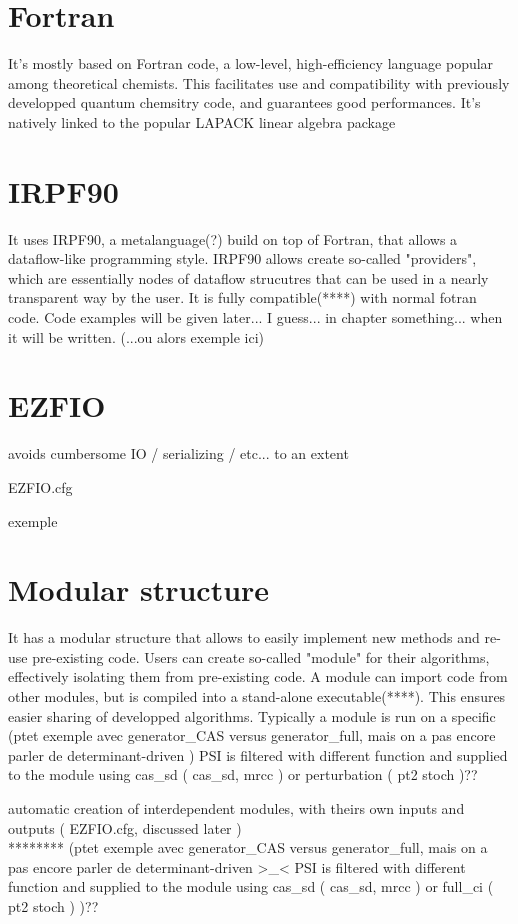 \documentclass[./thesis.tex]{subfiles}
\begin{document}
\section{Fortran}
It's mostly based on Fortran code, a low-level, high-efficiency language popular among theoretical chemists. This facilitates use and compatibility with previously developped quantum chemsitry code, and guarantees good performances. It's natively linked to the popular LAPACK linear algebra package

\section{IRPF90}
It uses IRPF90, a metalanguage(?) build on top of Fortran, that allows a dataflow-like programming style.
IRPF90 allows create so-called "providers", which are essentially nodes of dataflow strucutres that can be used in a nearly transparent way by the user. It is fully compatible(****) with normal fotran code. Code examples will be given later... I guess... in chapter something... when it will be written.
(...ou alors exemple ici)


\section{EZFIO}


avoids cumbersome IO / serializing / etc... to an extent

EZFIO.cfg

exemple

\section{Modular structure}

It has a modular structure that allows to easily implement new methods and re-use pre-existing code.
Users can create so-called "module" for their algorithms, effectively isolating them from pre-existing code. A module can import code from other modules, but is compiled into a stand-alone executable(****). This ensures easier sharing of developped algorithms.
Typically a module is run on a specific 
(ptet exemple avec generator\_CAS versus generator\_full, mais on a pas encore parler de determinant-driven )
PSI is filtered with different function and supplied to the module using cas\_sd ( cas\_sd, mrcc ) or perturbation ( pt2 stoch )??

automatic creation of interdependent modules, with theirs own inputs and outputs ( EZFIO.cfg, discussed later ) \\
******** (ptet exemple avec generator\_CAS versus generator\_full, mais on a pas encore parler de determinant-driven >\_< PSI is filtered with different function and supplied to the module using cas\_sd ( cas\_sd, mrcc ) or full\_ci ( pt2 stoch ) )?? \\
\end{document}
